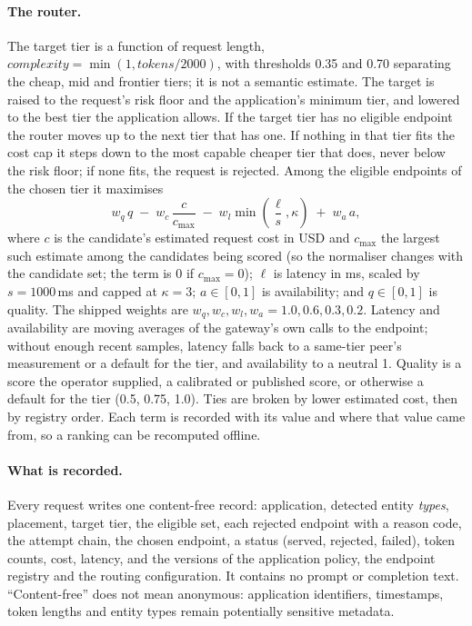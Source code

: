 \documentclass[11pt]{article}
\begin{document}
\paragraph{The router.} The target tier is a function of request length,
$\mathit{complexity} = \min(1, \mathit{tokens}/2000)$, with thresholds 0.35 and 0.70 separating
the cheap, mid and frontier tiers; it is not a semantic estimate. The target is raised to the
request's risk floor and the application's minimum tier, and lowered to the best tier the
application allows. If the target tier has no eligible endpoint the router moves up to the
next tier that has one. If nothing in that tier fits the cost cap it steps down to the most
capable cheaper tier that does, never below the risk floor; if none fits, the request is
rejected. Among the eligible endpoints of the chosen tier it maximises
\begin{equation}
  w_q\, q \;-\; w_c\, \frac{c}{c_{\max}} \;-\; w_l \min\!\left(\frac{\ell}{s}, \kappa\right)
  \;+\; w_a\, a ,
  \label{eq:score}
\end{equation}
where $c$ is the candidate's estimated request cost in USD and $c_{\max}$ the largest such
estimate among the candidates being scored (so the normaliser changes with the candidate set;
the term is 0 if $c_{\max}=0$); $\ell$ is latency in ms, scaled by $s = 1000$\,ms and capped at
$\kappa = 3$; $a \in [0,1]$ is availability; and $q \in [0,1]$ is quality. The shipped weights
are $w_q, w_c, w_l, w_a = 1.0, 0.6, 0.3, 0.2$. Latency and availability are moving averages of
the gateway's own calls to the endpoint; without enough recent samples, latency falls back to
a same-tier peer's measurement or a default for the tier, and availability to a neutral 1.
Quality is a score the operator supplied, a calibrated or published score, or otherwise a
default for the tier (0.5, 0.75, 1.0). Ties are broken by lower estimated cost, then by
registry order. Each term is recorded with its value and where that value came from, so a
ranking can be recomputed offline.

\paragraph{What is recorded.} Every request writes one content-free record: application,
detected entity \emph{types}, placement, target tier, the eligible set, each rejected endpoint
with a reason code, the attempt chain, the chosen endpoint, a status (served, rejected, failed),
token counts, cost, latency, and the versions of the application policy, the endpoint registry
and the routing configuration. It contains no prompt or completion text. ``Content-free'' does
not mean anonymous: application identifiers, timestamps, token lengths and entity types remain
potentially sensitive metadata.
\end{document}

